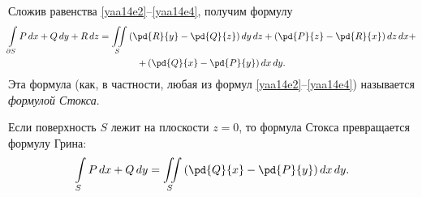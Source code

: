 Сложив равенства \eqref{yaa14e2}--\eqref{yaa14e4}, получим формулу
\begin{multline*}
\int\limits_{\partial S} P\,dx+Q\,dy+R\,dz = \iint\limits_S \left(\pd{R}{y}-\pd{Q}{z}\right)dy\,dz + \left(\pd{P}{z}-\pd{R}{x}\right)dz\,dx+\\+\left(\pd{Q}{x}-\pd{P}{y}\right)dx\,dy.
\end{multline*}
Эта формула (как, в частности, любая из формул \eqref{yaa14e2}--\eqref{yaa14e4}) называется \textit{формулой Стокса}.

Если поверхность $S$ лежит на плоскости $z=0$, то формула Стокса превращается формулу Грина: 
$$
\int\limits_S P\,dx+Q\,dy = \iint\limits_S\left(\pd{Q}{x}-\pd{P}{y}\right)dx\,dy.
$$


